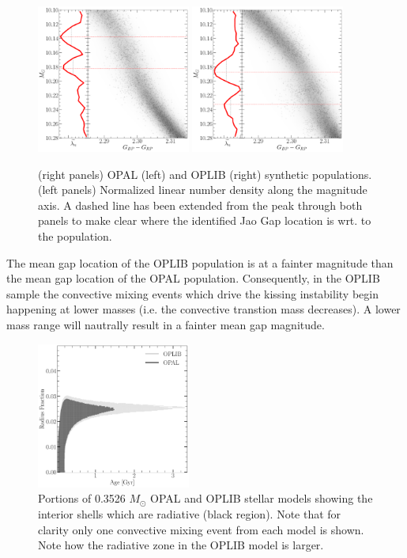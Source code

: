 \begin{figure}
	\centering
	\includegraphics[width=0.45\textwidth]{OPAL_Jao_locator.pdf}
	\includegraphics[width=0.45\textwidth]{OPLIB_Jao_locator.pdf}
	\caption{(right panels) OPAL (left) and OPLIB (right) synthetic
	populations. (left panels) Normalized linear number density along the
	magnitude axis. A dashed line has been extended from the peak through both
	panels to make clear where the identified Jao Gap location is wrt. to the
	population. }
	\label{fig:JaoGapLocator}
\end{figure}

The mean gap location of the OPLIB population is at a fainter magnitude than
the mean gap location of the OPAL population. Consequently, in the OPLIB sample
the convective mixing events which drive the kissing instability begin
happening at lower masses (i.e. the convective transtion mass decreases). A
lower mass range will nautrally result in a fainter mean gap magnitude.

\begin{figure}
	\centering
	\includegraphics[width=0.45\textwidth]{SameMassConvectiveZoneComp.pdf}
	\caption{Portions of 0.3526 $M_{\odot}$ OPAL and OPLIB stellar models
	showing the interior shells which are radiative (black region). Note that
	for clarity only one convective mixing event from each model is shown. Note
	how the radiative zone in the OPLIB model is larger.}
	\label{fig:Unstable}
\end{figure}

